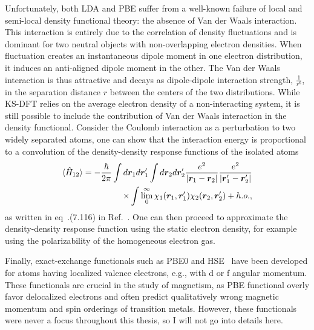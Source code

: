 Unfortunately, both LDA and PBE suffer from a well-known failure of local and semi-local density functional theory: the absence of Van der Waals interaction.
This interaction is entirely due to the correlation of density fluctuations and is dominant for two neutral objects with non-overlapping electron densities.
When fluctuation creates an instantaneous dipole moment in one electron distribution, it induces an anti-aligned dipole moment in the other.
The Van der Waals interaction is thus attractive and decays as dipole-dipole interaction strength, $\frac{1}{r^6}$, in the separation distance $r$ between the centers of the two distributions.
While KS-DFT relies on the average electron density of a non-interacting system, it is still possible to include the contribution of Van der Waals interaction in the density functional.
Consider the Coulomb interaction as a perturbation to two widely separated atoms, one can show that the interaction energy is proportional to a convolution of the density-density response functions of the isolated atoms
\begin{align}
\braket{\hat{H}_{12}} = -\dfrac{\hbar}{2\pi}
\int d\boldsymbol{r}_1d\boldsymbol{r}_1'
\int d\boldsymbol{r}_2d\boldsymbol{r}_2'
\dfrac{e^2}{\vert\boldsymbol{r}_1-\boldsymbol{r}_2\vert}
\dfrac{e^2}{\vert\boldsymbol{r}_1'-\boldsymbol{r}_2'\vert} \nonumber \\
\times\int\lim\limits_0^{\infty}
\chi_1(\boldsymbol{r}_1, \boldsymbol{r}_1')
\chi_2(\boldsymbol{r}_2, \boldsymbol{r}_2') + h.o.,
\end{align}
as written in eq~.(7.116) in Ref.~\cite{Giuliani2005}. One can then proceed to approximate the density-density response function using the static electron density, for example using the polarizability of the homogeneous electron gas.

Finally, exact-exchange functionals such as PBE0 and HSE~\cite{Heyd2003} have been developed for atoms having localized valence electrons, e.g., with d or f angular momentum.
These functionals are crucial in the study of magnetism, as PBE functional overly favor delocalized electrons and often predict qualitatively wrong magnetic momentum and spin orderings of transition metals.
However, these functionals were never a focus throughout this thesis, so I will not go into details here.
